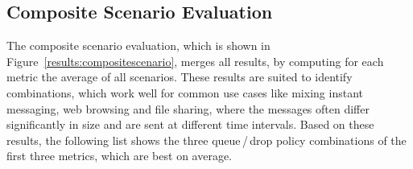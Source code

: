 \documentclass[conference,10pt,letterpaper,final]{IEEEtran}
\begin{document}
\subsection{Composite Scenario Evaluation}
\label{subsec:evaluation:compositescenario}
The composite scenario evaluation, which is shown in Figure~\ref{results:compositescenario}, merges all results, by computing for each metric the average of all scenarios.
These results are suited to identify combinations, which work well for common use cases like mixing instant messaging, web browsing and file sharing, where the messages often differ significantly in size and are sent at different time intervals.
Based on these results, the following list shows the three queue\,/\,drop policy combinations of the first three metrics, which are best on average.

\vspace{0.2cm} 
\end{document}
